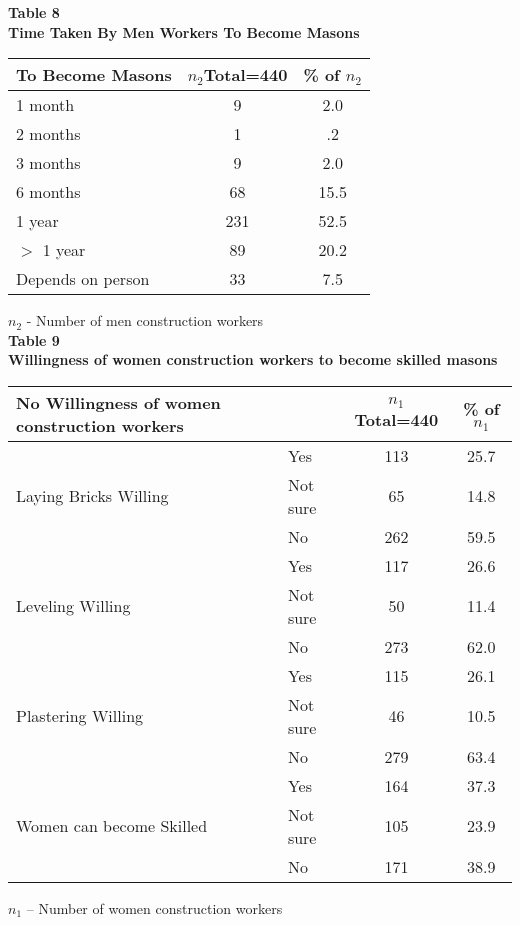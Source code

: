 \documentclass[12pt]{report}
\newcommand{\bt}[1]{\textbf{#1}}
\newcommand{\NI}{\noindent}
\begin{document}
	\NI\bt{Table 8}\\
	\bt{Time Taken By Men Workers To Become Masons}
	\begin{longtable}{p{}@{\hskip 0.45in}c@{\hskip 0.45in}c@{\hskip 0.45in}}
		\hline
		\bt{To Become Masons}  & $n_2${\footnotesize Total=440}  & {\footnotesize\% of }$n_2$\\ \hline
		1 month & 9 & 2.0 \\
		2 months & 1 & .2\\
		3 months & 9 & 2.0\\
		6 months  & 68 & 15.5\\
		1 year & 231 & 52.5\\
		$>$ 1 year  & 89 & 20.2\\ 
		Depends on person & 33 & 7.5\\ \hline
	\end{longtable}
	$n_2$ - Number of men construction workers\\

	
	\NI\bt{Table 9}\\
	\bt{Willingness of women construction workers to become skilled masons}
	\begin{longtable}{p{}@{\hskip 0.1in}l@{\hskip 0.2in}c@{\hskip 0.2in}c@{\hskip 0.2in}}
		\hline
		\bt{No Willingness of women	construction workers} & & $n_1${\footnotesize Total=440} & {\footnotesize\% of }$n_1$\\ \hline
		\multirow{3}{=}{Laying Bricks Willing} & Yes & 113 & 25.7 \\
		& Not sure & 65 & 14.8\\
		& No & 262 & 59.5 \\ \hline
		\multirow{3}{=}{Leveling Willing} & Yes & 117 & 26.6 \\
		& Not sure & 50 & 11.4\\
		& No & 273 & 62.0 \\ \hline
		\multirow{3}{=}{Plastering Willing} & Yes & 115 & 26.1 \\
		& Not sure & 46 & 10.5\\
		& No & 279 & 63.4 \\ \hline
		\multirow{3}{=}{Women can become Skilled} & Yes & 164 & 37.3 \\
		& Not sure & 105 & 23.9\\
		& No & 171 & 38.9 \\ \hline
	\end{longtable}
	$n_1$ – Number of women construction workers\\
\end{document}
